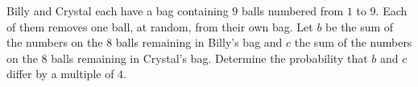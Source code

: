 Billy and Crystal each have a bag containing $9$ balls numbered from $1$ to $9$. Each of them removes one ball, at random, from their own bag. Let $b$ be the sum of the numbers on the $8$ balls remaining in Billy's bag and $c$ the sum of the numbers on the $8$ balls remaining in Crystal's bag. Determine the probability that $b$ and $c$ differ by a multiple of $4$.
